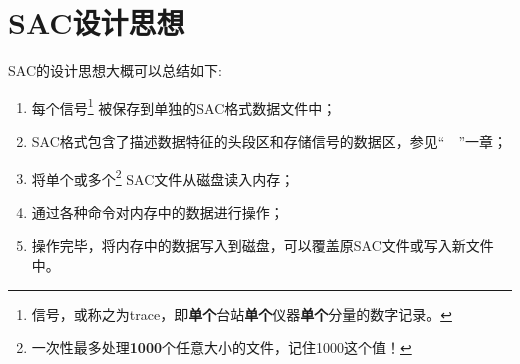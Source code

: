\section{SAC设计思想}
SAC的设计思想大概可以总结如下:
\begin{enumerate}
    \item 每个信号\footnote{信号，或称之为trace，即\textbf{单个}台站\textbf{单个}仪器\textbf{单个}分量的数字记录。}
被保存到单独的SAC格式数据文件中；
\item SAC格式包含了描述数据特征的头段区和存储信号的数据区，参见``~~''一章；
\item 将单个或多个\footnote{一次性最多处理\textbf{1000}个任意大小的文件，记住1000这个值！}
    SAC文件从磁盘读入内存；
\item 通过各种命令对内存中的数据进行操作；
\item 操作完毕，将内存中的数据写入到磁盘，可以覆盖原SAC文件或写入新文件中。
\end{enumerate}

